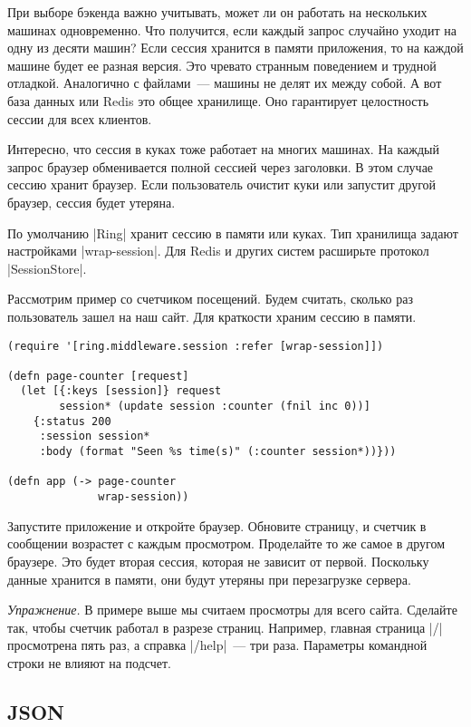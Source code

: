 При выборе бэкенда важно учитывать, может ли он работать на нескольких машинах
одновременно. Что получится, если каждый запрос случайно уходит на одну из
десяти машин? Если сессия хранится в памяти приложения, то на каждой машине
будет ее разная версия. Это чревато странным поведением и трудной
отладкой. Аналогично с файлами~--- машины не делят их между собой. А вот база
данных или Redis это общее хранилище. Оно гарантирует целостность сессии для
всех клиентов.

Интересно, что сессия в куках тоже работает на многих машинах. На каждый запрос
браузер обменивается полной сессией через заголовки. В этом случае сессию
хранит браузер. Если пользователь очистит куки или запустит другой
браузер, сессия будет утеряна.

По умолчанию \spverb|Ring| хранит сессию в памяти или куках. Тип хранилища
задают настройками \spverb|wrap-session|. Для Redis и других систем расширьте
протокол \spverb|SessionStore|.

Рассмотрим пример со счетчиком посещений. Будем считать, сколько раз
пользователь зашел на наш сайт. Для краткости храним сессию в памяти.

\begin{verbatim}
(require '[ring.middleware.session :refer [wrap-session]])

(defn page-counter [request]
  (let [{:keys [session]} request
        session* (update session :counter (fnil inc 0))]
    {:status 200
     :session session*
     :body (format "Seen %s time(s)" (:counter session*))}))

(defn app (-> page-counter
              wrap-session))
\end{verbatim}

Запустите приложение и откройте браузер. Обновите страницу, и счетчик в
сообщении возрастет с каждым просмотром. Проделайте то же самое в другом
браузере. Это будет вторая сессия, которая не зависит от первой. Поскольку
данные хранится в памяти, они будут утеряны при перезагрузке сервера.

\emph{Упражнение.} В примере выше мы считаем просмотры для всего сайта. Сделайте
так, чтобы счетчик работал в разрезе страниц. Например, главная страница
\spverb|/| просмотрена пять раз, а справка \spverb|/help|~--- три
раза. Параметры командной строки не влияют на подсчет.

\subsection{JSON}

